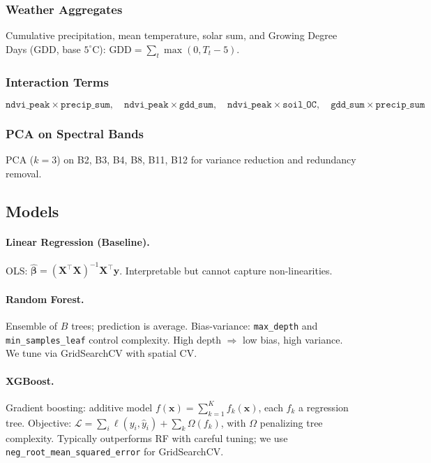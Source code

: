 \documentclass[conference]{IEEEtran}
\begin{document}
\subsubsection{Weather Aggregates}
Cumulative precipitation, mean temperature, solar sum, and Growing Degree Days (GDD, base $5^\circ$C):
$ \text{GDD} = \sum_t \max(0, T_t - 5) $.

\subsubsection{Interaction Terms}
\begin{equation}
  \texttt{ndvi\_peak} \times \texttt{precip\_sum},\quad
  \texttt{ndvi\_peak} \times \texttt{gdd\_sum},\quad
  \texttt{ndvi\_peak} \times \texttt{soil\_OC},\quad
  \texttt{gdd\_sum} \times \texttt{precip\_sum}
\end{equation}

\subsubsection{PCA on Spectral Bands}
PCA ($k=3$) on B2, B3, B4, B8, B11, B12 for variance reduction and redundancy removal.

\subsection{Models}

\paragraph{Linear Regression (Baseline).} OLS: $\hat{\boldsymbol{\beta}} = (\mathbf{X}^\top\mathbf{X})^{-1}\mathbf{X}^\top\mathbf{y}$. Interpretable but cannot capture non-linearities.

\paragraph{Random Forest.} Ensemble of $B$ trees; prediction is average. Bias-variance: \texttt{max\_depth} and \texttt{min\_samples\_leaf} control complexity. High depth $\Rightarrow$ low bias, high variance. We tune via GridSearchCV with spatial CV.

\paragraph{XGBoost.} Gradient boosting: additive model $f(\mathbf{x}) = \sum_{k=1}^{K} f_k(\mathbf{x})$, each $f_k$ a regression tree. Objective: $\mathcal{L} = \sum_i \ell(y_i, \hat{y}_i) + \sum_k \Omega(f_k)$, with $\Omega$ penalizing tree complexity. Typically outperforms RF with careful tuning; we use \texttt{neg\_root\_mean\_squared\_error} for GridSearchCV.
\end{document}
